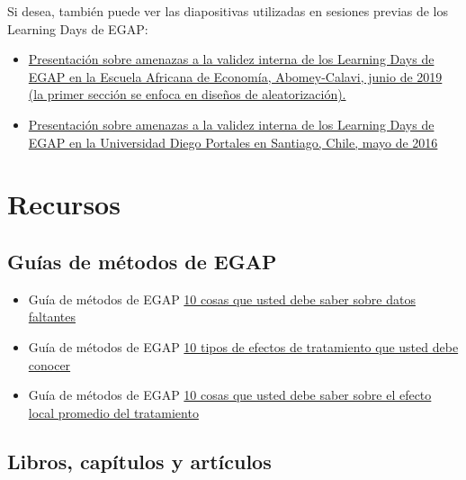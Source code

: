 \documentclass[
  12pt,
  spanish,
]{book}
\begin{document}
Si desea, también puede ver las diapositivas utilizadas en sesiones previas de los Learning Days de EGAP:

\begin{itemize}
\item
  \href{https://egap.github.io/learningdays-resources/Slides/Examples/threats-benin.pdf}{Presentación sobre amenazas a la validez interna de los Learning Days de EGAP en la Escuela Africana de Economía, Abomey-Calavi, junio de 2019 (la primer sección se enfoca en diseños de aleatorización).}
\item
  \href{https://egap.github.io/learningdays-resources/Slides/Examples/threats-santiago.pdf}{Presentación sobre amenazas a la validez interna de los Learning Days de EGAP en la Universidad Diego Portales en Santiago, Chile, mayo de 2016}
\end{itemize}

\hypertarget{recursos-7}{%
\section{Recursos}\label{recursos-7}}

\hypertarget{guuxedas-de-muxe9todos-de-egap-6}{%
\subsection{Guías de métodos de EGAP}\label{guuxedas-de-muxe9todos-de-egap-6}}

\begin{itemize}
\item
  Guía de métodos de EGAP \href{https://egap.org/resource/10-things-to-know-about-missing-data/}{10 cosas que usted debe saber sobre datos faltantes}
\item
  Guía de métodos de EGAP \href{https://egap.org/resource/10-types-of-treatment-effect-you-should-know-about/}{10 tipos de efectos de tratamiento que usted debe conocer}
\item
  Guía de métodos de EGAP \href{https://egap.org/resource/10-things-to-know-about-the-local-average-treatment-effect/}{10 cosas que usted debe saber sobre el efecto local promedio del tratamiento}
\end{itemize}

\hypertarget{libros-capuxedtulos-y-artuxedculos-5}{%
\subsection{Libros, capítulos y artículos}\label{libros-capuxedtulos-y-artuxedculos-5}}
\end{document}
